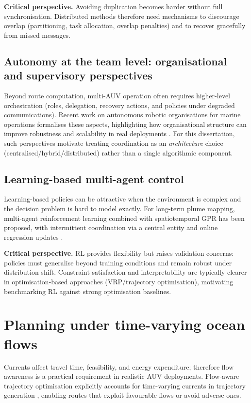 \textbf{Critical perspective.} Avoiding duplication becomes harder without full synchronisation. Distributed methods therefore need mechanisms to discourage overlap (partitioning, task allocation, overlap penalties) and to recover gracefully from missed messages.

\subsection{Autonomy at the team level: organisational and supervisory perspectives}
Beyond route computation, multi-AUV operation often requires higher-level orchestration (roles, delegation, recovery actions, and policies under degraded communications).
Recent work on autonomous robotic organisations for marine operations formalises these aspects, highlighting how organisational structure can improve robustness and scalability in real deployments \parencite{skaugset2025autonomousorg}.
For this dissertation, such perspectives motivate treating coordination as an \emph{architecture} choice (centralised/hybrid/distributed) rather than a single algorithmic component.

\subsection{Learning-based multi-agent control}
Learning-based policies can be attractive when the environment is complex and the decision problem is hard to model exactly.
For long-term plume mapping, multi-agent reinforcement learning combined with spatiotemporal GPR has been proposed, with intermittent coordination via a central entity and online regression updates \parencite{dalfabbro2025douroplume}.

\textbf{Critical perspective.} RL provides flexibility but raises validation concerns: policies must generalise beyond training conditions and remain robust under distribution shift.
Constraint satisfaction and interpretability are typically clearer in optimisation-based approaches (VRP/trajectory optimisation), motivating benchmarking RL against strong optimisation baselines.

\section{Planning under time-varying ocean flows} \label{sec:flows}

Currents affect travel time, feasibility, and energy expenditure; therefore flow awareness is a practical requirement in realistic AUV deployments.
Flow-aware trajectory optimisation explicitly accounts for time-varying currents in trajectory generation \parencite{aguiar2018trajectoryopt}, enabling routes that exploit favourable flows or avoid adverse ones.

